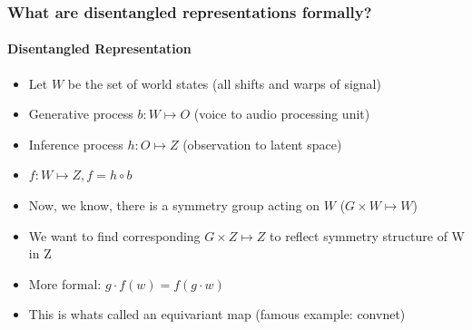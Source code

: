 \documentclass[9pt]{beamer}
\begin{document}
\begin{frame}
\frametitle{What are disentangled representations formally? }
\framesubtitle{Disentangled Representation}
\begin{itemize}%
	\item Let $W$ be the set of world states (all shifts and warps of signal)
	\item Generative process $b:W \mapsto O$ (voice to audio processing unit)
	\item Inference process $h: O \mapsto Z$ (observation to latent space)
	\item $f:W \mapsto Z, f = h \circ b$
	\item Now, we know, there is a symmetry group acting on $W$ ($G \times W \mapsto W$)
	\item We want to find corresponding $G \times Z \mapsto Z$ to reflect symmetry structure of W in Z
	\item More formal: $g \cdot f(w) = f(g\cdot w)$
	\item This is whats called an equivariant map (famous example: convnet)
\end{itemize}
\end{frame} 
\end{document}
